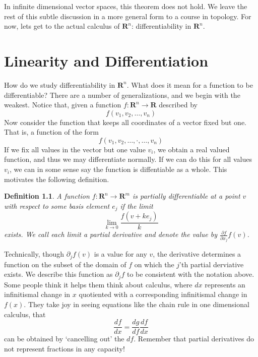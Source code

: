 \documentclass[12pt]{amsbook}
\theoremstyle{plain}
\newtheorem{definition}{Definition}
\theoremstyle{definition}
\newcommand{\pder}[2]{\frac{\partial #1}{\partial #2}}
\begin{document}
In infinite dimensional vector spaces, this theorem does not hold. We leave the rest of this subtle discussion in a more general form to a course in topology. For now, lets get to the actual calculus of $\mathbf{R}^n$: differentiability in $\mathbf{R}^n$.







\chapter{Linearity and Differentiation}

How do we study differentiability in $\mathbf{R}^n$. What does it mean for a function to be differentiable? There are a number of generalizations, and we begin with the weakest. Notice that, given a function $f:\mathbf{R}^n \to \mathbf{R}$ described by
%
\[ f(v_1, v_2, \dots ,v_n) \]
%
Now consider the function that keeps all coordinates of a vector fixed but one. That is, a function of the form
%
\[ f(v_1, v_2, \dots, \cdot, \dots, v_n) \]
%
If we fix all values in the vector but one value $v_i$, we obtain a real valued function, and thus we may differentiate normally. If we can do this for all values $v_i$, we can in some sense say the function is diffentiable as a whole. This motivates the following definition.

\begin{definition}
  A function $f: \mathbf{R}^n \to \mathbf{R}^m$ is partially differentiable at a point $v$ with respect to some basis element $e_j$ if the limit
  \[ \lim_{k \to 0} \frac{f(v + ke_j)}{k} \]
  exists. We call each limit a partial derivative and denote the value by $\pder{f}{x_j}f(v)$.
\end{definition}

Technically, though $\partial_jf(v)$ is a value for any $v$, the derivative determines a function on the subset of the domain of $f$ on which the $j$'th partial derviative exists. We describe this function as $\partial_jf$ to be consistent with the notation above. Some people think it helps them think about calculus, where $dx$ represents an infinitismal change in $x$ quotiented with a corresponding infinitismal change in $f(x)$. They take joy in seeing equations like the chain rule in one dimensional calculus, that
%
\[ \frac{df}{dx} = \frac{dg}{df} \frac{df}{dx} \]
%
can be obtained by `cancelling out' the $df$. Remember that partial derivatives do not represent fractions in any capacity!
\end{document}
